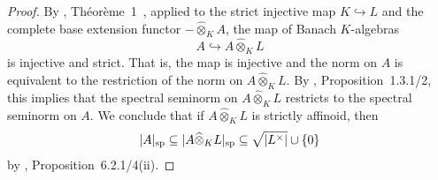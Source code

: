 \begin{proof}By \cite{Gruson}, Théorème~1~, applied to the strict injective map $K\hookrightarrow L$ and the complete base extension functor $-\widehat{\otimes}_{K}A$, the map of Banach $K$-algebras \begin{equation*}A\hookrightarrow A\widehat{\otimes}_{K}L\end{equation*}is injective and strict. That is, the map is injective and the norm on $A$ is equivalent to the restriction of the norm on $A\widehat{\otimes}_{K}L$. By \cite{BGR}, Proposition~1.3.1/2, this implies that the spectral seminorm on $A\widehat{\otimes}_{K}L$ restricts to the spectral seminorm on $A$. We conclude that if $A\widehat{\otimes}_{K}L$ is strictly affinoid, then \begin{equation*}\vert A\vert_{\mathrm{sp}}\subseteq \vert A\widehat{\otimes}_{K}L\vert_{\mathrm{sp}}\subseteq \sqrt{\vert L^{\times}\vert}\cup\{0\}\end{equation*}by \cite{BGR}, Proposition~6.2.1/4(ii). 


\end{proof}
